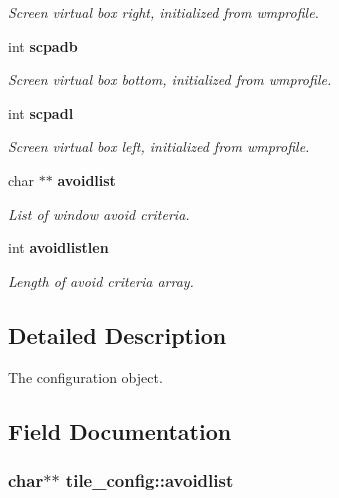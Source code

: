 \begin{CompactItemize}
\begin{CompactList}\small\item\em Screen virtual box right, initialized from wmprofile. \item\end{CompactList}\item 
int {\bf scpadb}
\begin{CompactList}\small\item\em Screen virtual box bottom, initialized from wmprofile. \item\end{CompactList}\item 
int {\bf scpadl}
\begin{CompactList}\small\item\em Screen virtual box left, initialized from wmprofile. \item\end{CompactList}\item 
char $\ast$$\ast$ {\bf avoidlist}
\begin{CompactList}\small\item\em List of window avoid criteria. \item\end{CompactList}\item 
int {\bf avoidlistlen}
\begin{CompactList}\small\item\em Length of avoid criteria array. \item\end{CompactList}\end{CompactItemize}


\subsection{Detailed Description}
The configuration object. 



\subsection{Field Documentation}
\subsubsection{\setlength{\rightskip}{0pt plus 5cm}char$\ast$$\ast$ {\bf tile\_\-config::avoidlist}}\label{structtile__config_o9}


